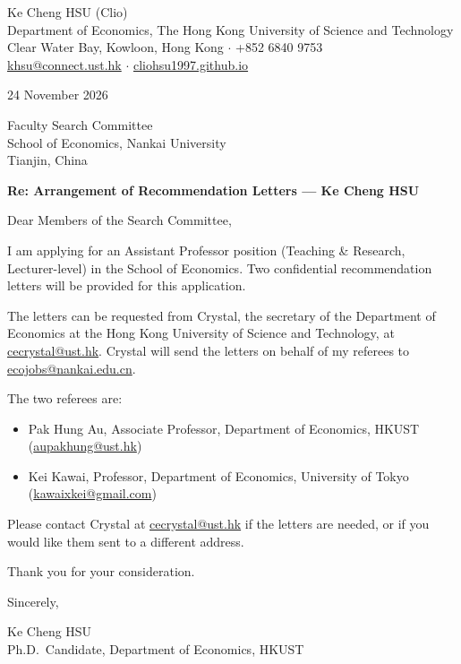 \documentclass[11pt]{article}
\begin{document}
\begin{flushleft}
Ke Cheng HSU (Clio) \\
Department of Economics, The Hong Kong University of Science and Technology \\
Clear Water Bay, Kowloon, Hong Kong $\cdot$ +852 6840 9753 \\
\href{mailto:khsu@connect.ust.hk}{khsu@connect.ust.hk} $\cdot$ \href{https://cliohsu1997.github.io/}{cliohsu1997.github.io}
\end{flushleft}

24 November 2026

\vspace{0.2em}
Faculty Search Committee \\
School of Economics, Nankai University \\
Tianjin, China

\vspace{0.2em}
\textbf{Re: Arrangement of Recommendation Letters --- Ke Cheng HSU}

\vspace{0.1em}
Dear Members of the Search Committee,

I am applying for an Assistant Professor position (Teaching \& Research, Lecturer-level) in the School of Economics. Two confidential recommendation letters will be provided for this application.

The letters can be requested from Crystal, the secretary of the Department of Economics at the Hong Kong University of Science and Technology, at \href{mailto:cecrystal@ust.hk}{cecrystal@ust.hk}. Crystal will send the letters on behalf of my referees to \href{mailto:ecojobs@nankai.edu.cn}{ecojobs@nankai.edu.cn}.

The two referees are:

\begin{itemize}
  \item Pak Hung Au, Associate Professor, Department of Economics, HKUST (\href{mailto:aupakhung@ust.hk}{aupakhung@ust.hk})
  \item Kei Kawai, Professor, Department of Economics, University of Tokyo (\href{mailto:kawaixkei@gmail.com}{kawaixkei@gmail.com})
\end{itemize}

Please contact Crystal at \href{mailto:cecrystal@ust.hk}{cecrystal@ust.hk} if the letters are needed, or if you would like them sent to a different address.

Thank you for your consideration.

\vspace{0.4em}
Sincerely,

\vspace{0.5em}
Ke Cheng HSU \\
Ph.D.\ Candidate, Department of Economics, HKUST
\end{document}
